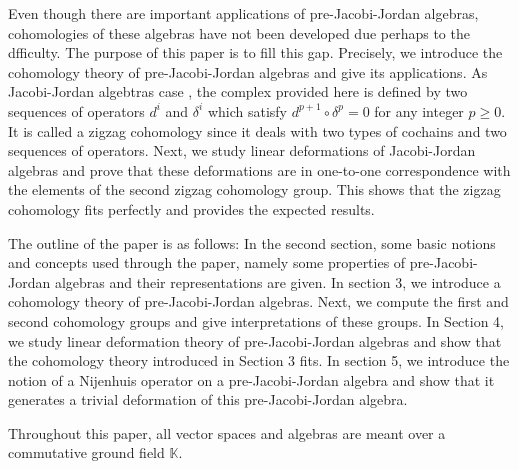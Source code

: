 \documentclass[12pt]{amsart}
\begin{document}
	Even though there are important applications of pre-Jacobi-Jordan algebras, cohomologies of these algebras have not been developed due perhaps to the dfficulty.
	The purpose of this paper is to fill this gap. Precisely, we introduce the cohomology theory of pre-Jacobi-Jordan algebras and give its applications. As Jacobi-Jordan algebtras case \cite{abak}, the complex provided here is defined by two sequences of operators
	$d^i$ and $\delta^i$ which satisfy $d^{p+1}\circ\delta^p=0$ for any integer $p\geq 0$. It is called a zigzag cohomology since it deals with  two types of cochains and two sequences of operators. Next, we study  linear deformations of Jacobi-Jordan algebras and prove that these deformations are in one-to-one correspondence with the elements of the second zigzag cohomology group. This shows that the zigzag cohomology fits perfectly and provides the expected results. 
	
	
	The outline of the paper is as follows: In the second section, some basic notions
	and concepts used through the paper, namely some properties of pre-Jacobi-Jordan algebras and
	their representations are given.
	In section 3,  we introduce a cohomology theory of pre-Jacobi-Jordan algebras. Next, we compute the first and second cohomology groups and give interpretations of these groups.
 In Section 4, we study linear deformation theory of pre-Jacobi-Jordan algebras and show that the cohomology theory introduced in Section 3 fits. In section 5, we introduce the notion of a Nijenhuis operator on a pre-Jacobi-Jordan algebra and show that it generates a trivial deformation of this pre-Jacobi-Jordan algebra.
 
	Throughout this paper, all vector spaces and algebras are meant over a commutative ground field $\mathbb{K}$.
\end{document}
